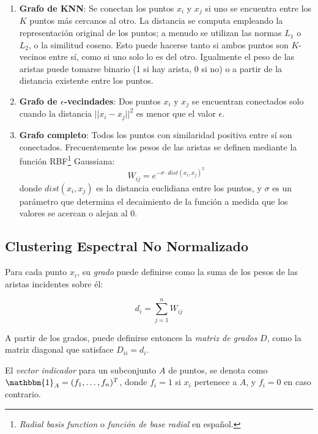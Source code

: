 \begin{enumerate}
    \item \textbf{Grafo de KNN}: Se conectan los puntos $x_i$ y $x_j$ si uno se encuentra entre los $K$ puntos más cercanos al otro.
    La distancia se computa empleando la representación original de los puntos;
    a menudo se utilizan las normas $L_1$ o $L_2$, o la similitud coseno.
    Esto puede hacerse tanto si ambos puntos son $K$-vecinos entre sí, como si uno solo lo es del otro.
    Igualmente el peso de las aristas puede tomarse binario (1 si hay arista, 0 si no) o a partir de la distancia existente entre los puntos.

    \item \textbf{Grafo de $\epsilon$-vecindades}: Dos puntos $x_i$ y $x_j$ se encuentran conectados solo cuando la distancia $|| x_i - x_j ||^2$ es menor que el valor $\epsilon$.

    \item \textbf{Grafo completo}: Todos los puntos con similaridad positiva entre sí son conectados.
    Frecuentemente los pesos de las aristas se definen mediante la función RBF\footnote{\textit{Radial basis function} o \textit{función de base radial} en español.} Gaussiana:
    \[
        W_{ij} = e^{-\sigma \cdot dist(x_i , x_j)^2}
    \]
    donde $dist(x_i , x_j)$ es la distancia euclidiana entre los puntos, y $\sigma$ es un parámetro que determina el decaimiento de la función a medida que los valores se acercan o alejan al 0.
\end{enumerate}

\subsection{Clustering Espectral No Normalizado}\label{subsec:clusteringEspectralNoNormalizado}

Para cada punto $x_i$, su \textit{grado} puede definirse como la suma de los pesos de las aristas incidentes sobre él:

\begin{equation*}
    d_i = \sum_{j=1}^{n}{W_{ij}}
\end{equation*}

A partir de los grados, puede definirse entonces la \textit{matriz de grados} $D$, como la matriz diagonal que satisface $D_{ii}=d_i$.

El \textit{vector indicador} para un subconjunto $A$ de puntos, se denota como $\mathbbm{1}_A = (f_1,\dots,f_n)^T$, donde $f_i = 1$ si $x_i$ pertenece a $A$, y $f_i = 0$ en caso contrario.

